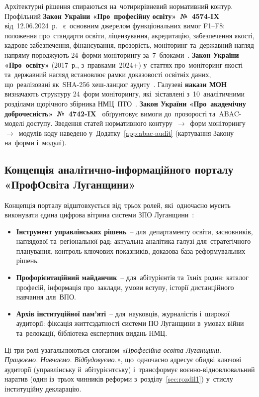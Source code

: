 Архітектурні рішення спираються на~чотирирівневий нормативний контур. Профільний \textbf{Закон України «Про~професійну освіту»~№~4574-IX} від~12.06.2024~р.~\cite{Zakon4574IX} є~основним джерелом функціональних вимог F1--F8: положення про~стандарти освіти, ліцензування, акредитацію, забезпечення якості, кадрове забезпечення, фінансування, прозорість, моніторинг та~державний нагляд напряму породжують 24~форми моніторингу за~7~блоками~\cite{Kostrytsia2025VETRecovery, Bazhan2025PPTERisks}. \textbf{Закон України «Про~освіту»} (2017~р., з~правками~2024+) у~статтях про~моніторинг якості та~державний нагляд встановлює рамки доказовості освітніх даних, що~реалізовані як~SHA-256 хеш-ланцюг аудиту~\cite{Penkin2025QAWar}. Галузеві \textbf{накази МОН} визначають структуру 24~форм моніторингу, які~зіставлені з~10~аналітичними розділами щорічного збірника НМЦ~ПТО~\cite{NMTsPTO2025}. \textbf{Закон України «Про~академічну доброчесність»~№~4742-IX}~\cite{AkademichnaDobrochesnist2024} обґрунтовує вимоги до~прозорості та~ABAC-моделі доступу. Зведення статей нормативного контуру~$\to$~форм моніторингу~$\to$~модулів коду наведено у~Додатку~\ref{app:abac-audit} (картування Закону на~форми і~модулі).

\subsection{Концепція аналітично-інформаційного порталу «ПрофОсвіта Луганщини»}
\label{sec:p2-portal}

Концепція порталу відштовхується від~трьох ролей, які~одночасно мусить виконувати єдина цифрова вітрина системи ЗПО Луганщини~\cite{NMTsPTO2025}:
\begin{itemize}
    \item \textbf{Інструмент управлінських рішень}~-- для~департаменту освіти, засновників, наглядової та~регіональної рад: актуальна аналітика галузі для~стратегічного планування, контроль ключових показників, доказова база реформувальних рішень.
    \item \textbf{Профорієнтаційний майданчик}~-- для~абітурієнтів та~їхніх родин: каталог професій, інформація про~заклади, умови вступу, історії дистанційного навчання для~ВПО.
    \item \textbf{Архів інституційної пам'яті}~-- для~науковців, журналістів і~широкої аудиторії: фіксація життєздатності системи ПО Луганщини в~умовах війни та~релокації, бібліотека експертних видань НМЦ.
\end{itemize}

Ці три ролі узагальнюються слоганом \emph{«Професійна освіта Луганщини. Працюємо. Навчаємо. Відбудовуємо.»}, що~одночасно адресує обидві ключові аудиторії (управлінську й~абітурієнтську) і~трансформує воєнно-відновлювальний наратив (один із~трьох чинників реформи з~розділу~\ref{sec:rozdil1}) у~стислу інституційну декларацію.


